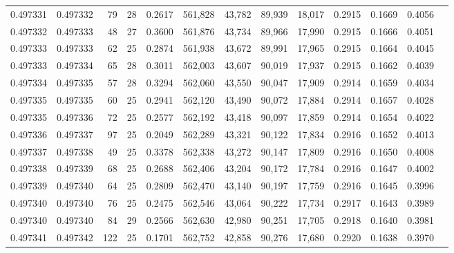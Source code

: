\begin{tabular}{rrrrrrrrrrrrr}
0.497331 & 0.497332 &  79 &  28 &                                     0.2617 & 561,828 &  43,782 &  89,939 &  18,017 & 0.2915 & 0.1669 & 0.4056 \\
0.497332 & 0.497333 &  48 &  27 &                                     0.3600 & 561,876 &  43,734 &  89,966 &  17,990 & 0.2915 & 0.1666 & 0.4051 \\
0.497333 & 0.497333 &  62 &  25 &                                     0.2874 & 561,938 &  43,672 &  89,991 &  17,965 & 0.2915 & 0.1664 & 0.4045 \\
0.497333 & 0.497334 &  65 &  28 &                                     0.3011 & 562,003 &  43,607 &  90,019 &  17,937 & 0.2915 & 0.1662 & 0.4039 \\
0.497334 & 0.497335 &  57 &  28 &                                     0.3294 & 562,060 &  43,550 &  90,047 &  17,909 & 0.2914 & 0.1659 & 0.4034 \\
0.497335 & 0.497335 &  60 &  25 &                                     0.2941 & 562,120 &  43,490 &  90,072 &  17,884 & 0.2914 & 0.1657 & 0.4028 \\
0.497335 & 0.497336 &  72 &  25 &                                     0.2577 & 562,192 &  43,418 &  90,097 &  17,859 & 0.2914 & 0.1654 & 0.4022 \\
0.497336 & 0.497337 &  97 &  25 &                                     0.2049 & 562,289 &  43,321 &  90,122 &  17,834 & 0.2916 & 0.1652 & 0.4013 \\
0.497337 & 0.497338 &  49 &  25 &                                     0.3378 & 562,338 &  43,272 &  90,147 &  17,809 & 0.2916 & 0.1650 & 0.4008 \\
0.497338 & 0.497339 &  68 &  25 &                                     0.2688 & 562,406 &  43,204 &  90,172 &  17,784 & 0.2916 & 0.1647 & 0.4002 \\
0.497339 & 0.497340 &  64 &  25 &                                     0.2809 & 562,470 &  43,140 &  90,197 &  17,759 & 0.2916 & 0.1645 & 0.3996 \\
0.497340 & 0.497340 &  76 &  25 &                                     0.2475 & 562,546 &  43,064 &  90,222 &  17,734 & 0.2917 & 0.1643 & 0.3989 \\
0.497340 & 0.497340 &  84 &  29 &                                     0.2566 & 562,630 &  42,980 &  90,251 &  17,705 & 0.2918 & 0.1640 & 0.3981 \\
0.497341 & 0.497342 & 122 &  25 &                                     0.1701 & 562,752 &  42,858 &  90,276 &  17,680 & 0.2920 & 0.1638 & 0.3970 \\

\end{tabular}
